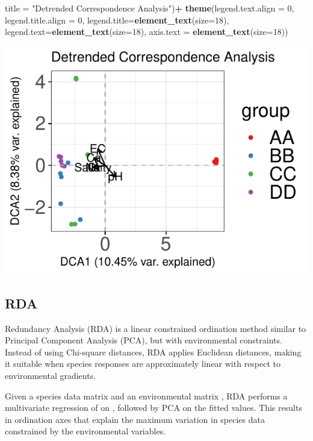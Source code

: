 \documentclass[
]{article}
\newenvironment{Shaded}{\begin{snugshade}}{\end{snugshade}}
\newcommand{\AttributeTok}[1]{\textcolor[rgb]{0.13,0.29,0.53}{#1}}
\newcommand{\DecValTok}[1]{\textcolor[rgb]{0.00,0.00,0.81}{#1}}
\newcommand{\FunctionTok}[1]{\textcolor[rgb]{0.13,0.29,0.53}{\textbf{#1}}}
\newcommand{\NormalTok}[1]{#1}
\newcommand{\SpecialCharTok}[1]{\textcolor[rgb]{0.81,0.36,0.00}{\textbf{#1}}}
\newcommand{\StringTok}[1]{\textcolor[rgb]{0.31,0.60,0.02}{#1}}
\begin{document}
\begin{Shaded}
\begin{Highlighting}[]
         \AttributeTok{title =} \StringTok{"Detrended Correspondence Analysis"}\NormalTok{)}\SpecialCharTok{+}
    \FunctionTok{theme}\NormalTok{(}\AttributeTok{legend.text.align =} \DecValTok{0}\NormalTok{, }\AttributeTok{legend.title.align =} \DecValTok{0}\NormalTok{,}
      \AttributeTok{legend.title=}\FunctionTok{element\_text}\NormalTok{(}\AttributeTok{size=}\DecValTok{18}\NormalTok{),}
      \AttributeTok{legend.text=}\FunctionTok{element\_text}\NormalTok{(}\AttributeTok{size=}\DecValTok{18}\NormalTok{),}
      \AttributeTok{axis.text =} \FunctionTok{element\_text}\NormalTok{(}\AttributeTok{size=}\DecValTok{18}\NormalTok{))}
\end{Highlighting}
\end{Shaded}

\includegraphics{workshop_files/figure-latex/unnamed-chunk-34-1.pdf}

\hypertarget{rda}{%
\subsection{RDA}\label{rda}}

Redundancy Analysis (RDA) is a linear constrained ordination method
similar to Principal Component Analysis (PCA), but with environmental
constraints. Instead of using Chi-square distances, RDA applies
Euclidean distances, making it suitable when species responses are
approximately linear with respect to environmental gradients.

Given a species data matrix and an environmental matrix , RDA performs a
multivariate regression of on , followed by PCA on the fitted values.
This results in ordination axes that explain the maximum variation in
species data constrained by the environmental variables.
\end{document}
